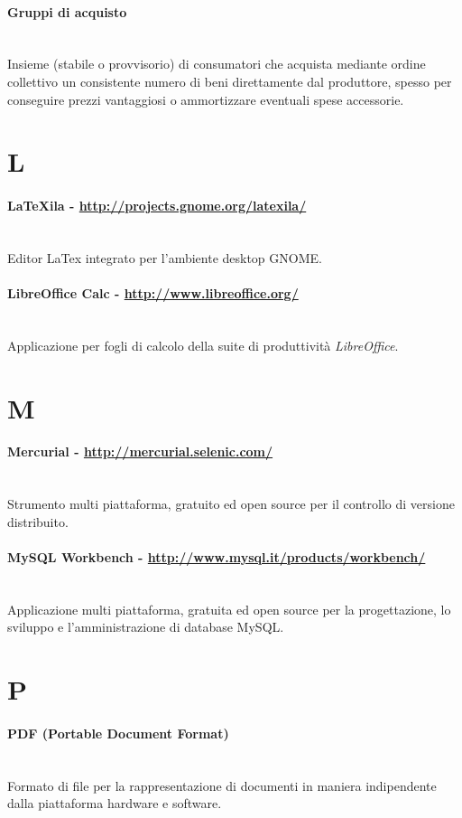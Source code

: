 \documentclass[11pt,a4paper,headsepline,hidelinks]{scrreprt} %
\begin{document}
	\paragraph{Gruppi di acquisto} \hfill \\
	Insieme (stabile o provvisorio) di consumatori che acquista mediante ordine collettivo un consistente numero di beni direttamente dal produttore, spesso per conseguire prezzi vantaggiosi o ammortizzare eventuali spese accessorie.
	
	\section*{L}
	\paragraph{LaTeXila - \url{http://projects.gnome.org/latexila/}} \hfill \\
	Editor LaTex integrato per l'ambiente desktop GNOME.
	\paragraph{LibreOffice Calc - \url{http://www.libreoffice.org/}} \hfill \\
  Applicazione per fogli di calcolo della suite di produttività \textit{LibreOffice}.

	\section*{M}
	\paragraph{Mercurial - \url{http://mercurial.selenic.com/}} \hfill \\
	Strumento multi piattaforma, gratuito ed open source per il controllo di versione distribuito.
	\paragraph{MySQL Workbench - \url{http://www.mysql.it/products/workbench/}} \hfill \\
	Applicazione multi piattaforma, gratuita ed open source per la progettazione, lo sviluppo e l'amministrazione di database MySQL. 

	\section*{P}
	\paragraph{PDF (Portable Document Format)} \hfill \\
	Formato di file per la rappresentazione di documenti in maniera indipendente dalla piattaforma hardware e software.
\end{document}

